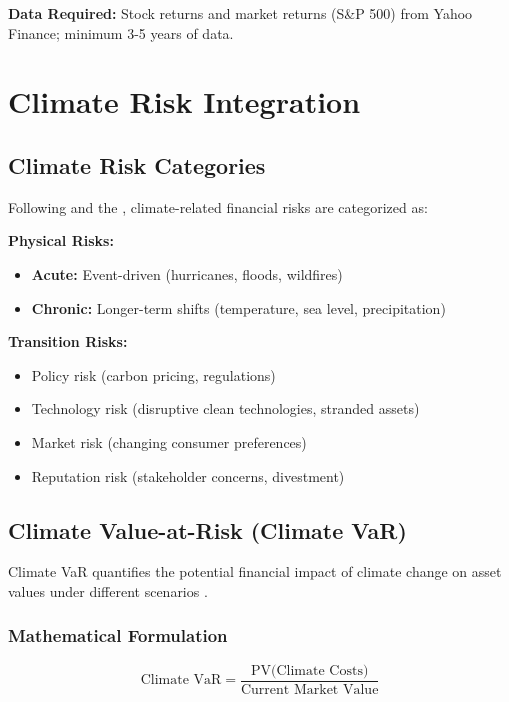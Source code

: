 \documentclass[11pt,a4paper]{article}
\begin{document}
\textbf{Data Required:} Stock returns and market returns (S\&P 500) from Yahoo Finance; minimum 3-5 years of data.

\section{Climate Risk Integration}

\subsection{Climate Risk Categories}

Following \citet{Campiglio2023} and the \citet{BaselCommittee2021}, climate-related financial risks are categorized as:

\textbf{Physical Risks:}
\begin{itemize}
    \item \textbf{Acute:} Event-driven (hurricanes, floods, wildfires)
    \item \textbf{Chronic:} Longer-term shifts (temperature, sea level, precipitation)
\end{itemize}

\textbf{Transition Risks:}
\begin{itemize}
    \item Policy risk (carbon pricing, regulations)
    \item Technology risk (disruptive clean technologies, stranded assets)
    \item Market risk (changing consumer preferences)
    \item Reputation risk (stakeholder concerns, divestment)
\end{itemize}

\subsection{Climate Value-at-Risk (Climate VaR)}

Climate VaR quantifies the potential financial impact of climate change on asset values under different scenarios \citep{MSCI2024, UNEPFI2019}.

\subsubsection{Mathematical Formulation}

\begin{equation}
\text{Climate VaR} = \frac{\text{PV(Climate Costs)}}{\text{Current Market Value}}
\end{equation}
\end{document}
